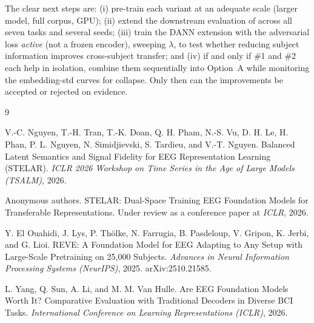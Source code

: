 \documentclass[11pt]{article}
\begin{document}
The clear next steps are: (i) pre-train each variant at an adequate scale
(larger model, full corpus, GPU); (ii) extend the downstream evaluation of
 across all seven tasks and several seeds; (iii) train the
DANN extension with the adversarial loss \emph{active} (not a frozen encoder),
sweeping $\lambda$, to test whether reducing subject information improves
cross-subject transfer; and (iv) if and only if \#1 and \#2 each help in
isolation, combine them sequentially into Option~A while monitoring the
embedding-std curves for collapse. Only then can the improvements be accepted or
rejected on evidence.

\begin{thebibliography}{9}
\small

V.-C. Nguyen, T.-H. Tran, T.-K. Doan, Q. H. Pham, N.-S. Vu, D. H. Le, H. Phan,
P. L. Nguyen, N. Simidjievski, S. Tardieu, and V.-T. Nguyen.
\newblock Balanced Latent Semantics and Signal Fidelity for EEG Representation
Learning (STELAR).
\newblock \emph{ICLR 2026 Workshop on Time Series in the Age of Large Models
(TSALM)}, 2026.

Anonymous authors.
\newblock STELAR: Dual-Space Training EEG Foundation Models for Transferable
Representations.
\newblock Under review as a conference paper at \emph{ICLR}, 2026.

Y. El Ouahidi, J. Lys, P. Th\"olke, N. Farrugia, B. Pasdeloup, V. Gripon,
K. Jerbi, and G. Lioi.
\newblock REVE: A Foundation Model for EEG Adapting to Any Setup with
Large-Scale Pretraining on 25,000 Subjects.
\newblock \emph{Advances in Neural Information Processing Systems (NeurIPS)},
2025. arXiv:2510.21585.

L. Yang, Q. Sun, A. Li, and M. M. Van Hulle.
\newblock Are EEG Foundation Models Worth It? Comparative Evaluation with
Traditional Decoders in Diverse BCI Tasks.
\newblock \emph{International Conference on Learning Representations (ICLR)}, 2026.

\end{thebibliography}
\end{document}
